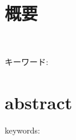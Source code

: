 \chapter*{概要}
\thispagestyle{empty}
%
\begin{center}
  \scalebox{1.5}{タイトル}\\
\end{center}
\vspace{1.0zh}
%


キーワード: 
%
\newpage
\chapter*{abstract}
\thispagestyle{empty}
%
\begin{center}
  \scalebox{1.3}{title}
\end{center}
\vspace{1.0zh}
%


keywords: 
